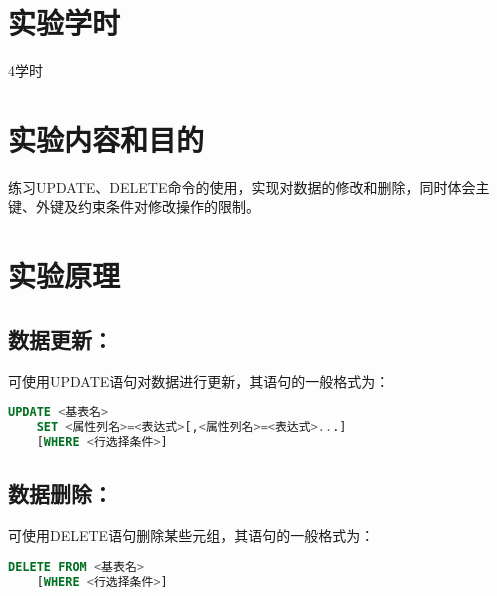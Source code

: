 \documentclass[a4paper]{uestcreport}
\begin{document}
\section{实验学时}
4学时

\section{实验内容和目的}
练习UPDATE、DELETE命令的使用，实现对数据的修改和删除，同时体会主键、外键及约束条件对修改操作的限制。

\section{实验原理}
\subsection{数据更新：}
可使用UPDATE语句对数据进行更新，其语句的一般格式为：
\begin{lstlisting}[language=SQL]
    UPDATE <基表名>
    SET <属性列名>=<表达式>[,<属性列名>=<表达式>...]
    [WHERE <行选择条件>]
\end{lstlisting}

\subsection{数据删除：}
可使用DELETE语句删除某些元组，其语句的一般格式为：
\begin{lstlisting}[language=SQL]
    DELETE FROM <基表名>
    [WHERE <行选择条件>]
\end{lstlisting}
\end{document}

